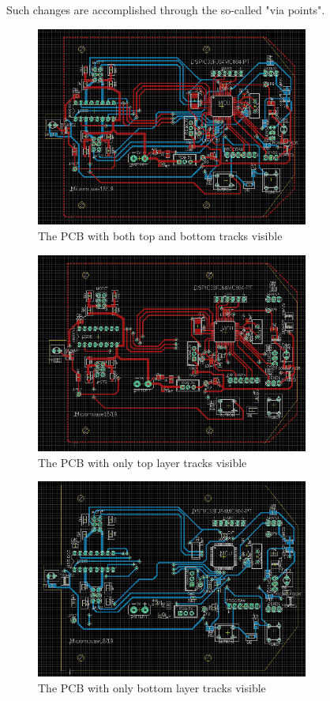 Such changes are accomplished through the so-called "via points".


\begin{figure}[htb]
    \centering
    \includegraphics[width=0.8\textwidth]{figures/hardware/PCB.PNG}
    \caption{The PCB with both top and bottom tracks visible}
    \label{fig:pcb}
\end{figure}

\begin{figure}[htb]
    \centering
    \includegraphics[width=0.8\textwidth]{figures/hardware/PCB_Top.PNG}
    \caption{The PCB with only top layer tracks visible}
    \label{fig:top}
\end{figure}

\begin{figure}[htb]
    \centering
    \includegraphics[width=0.8\textwidth]{figures/hardware/PCB_Bottom.PNG}
    \caption{The PCB with only bottom layer tracks visible}
    \label{fig:bottom}
\end{figure}

